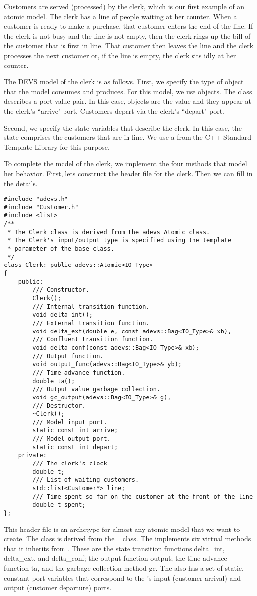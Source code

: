 Customers are served (processed) by the clerk, which is our first example of an atomic model. The clerk has a line of people waiting at her counter. When a customer is ready to make a purchase, that customer enters the end of the line. If the clerk is not busy and the line is not empty, then the clerk rings up the bill of the customer that is first in line. That customer then leaves the line and the clerk processes the next customer or, if the line is empty, the clerk sits idly at her counter.

The DEVS model of the clerk is as follows. First, we specify the type of object that the model consumes and produces. For this model, we use  objects. The  class describes a port-value pair. In this case,  objects are the value and they appear at the clerk's ``arrive" port. Customers depart via the clerk's ``depart" port.

Second, we specify the state variables that describe the clerk. In this case, the state comprises the customers that are in line. We use a  from the C++ Standard Template Library for this purpose.

To complete the model of the clerk, we implement the four methods that model her behavior. First, lets construct the header file for the clerk. Then we can fill in the details.
\begin{verbatim}
#include "adevs.h"
#include "Customer.h"
#include <list>
/**
 * The Clerk class is derived from the adevs Atomic class.
 * The Clerk's input/output type is specified using the template
 * parameter of the base class.
 */
class Clerk: public adevs::Atomic<IO_Type> 
{
    public:
        /// Constructor.
        Clerk();
        /// Internal transition function.
        void delta_int();
        /// External transition function.
        void delta_ext(double e, const adevs::Bag<IO_Type>& xb);
        /// Confluent transition function.
        void delta_conf(const adevs::Bag<IO_Type>& xb);
        /// Output function.  
        void output_func(adevs::Bag<IO_Type>& yb);
        /// Time advance function.
        double ta();
        /// Output value garbage collection.
        void gc_output(adevs::Bag<IO_Type>& g);
        /// Destructor.
        ~Clerk();
        /// Model input port.
        static const int arrive;
        /// Model output port.
        static const int depart;
    private:
        /// The clerk's clock
        double t;
        /// List of waiting customers.
        std::list<Customer*> line;
        /// Time spent so far on the customer at the front of the line
        double t_spent;
};
\end{verbatim}
This header file is an archetype for almost any atomic model that we want to create. The  class is derived from the \adevs\  class. The  implements six virtual methods that it inherits from . These are the state transition functions delta\_int, delta\_ext, and delta\_conf; the output function output; the time advance function ta, and the garbage collection method gc. The  also has a set of static, constant port variables that correspond to the 's input (customer arrival) and output (customer departure) ports.

